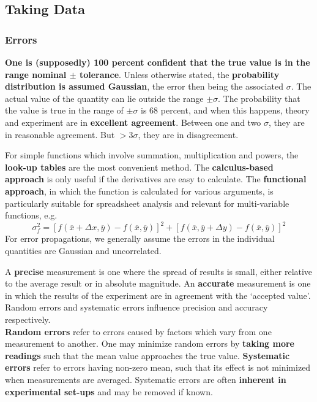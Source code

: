 \documentclass[a4paper]{article}
\begin{document}
\subsection{Taking Data}
\subsubsection*{Errors~\cite{squires_2001,hughes2010measurements}}
\begin{Note}
\textbf{One is (supposedly) 100 percent confident that the true value is in the range nominal $\pm$ tolerance}. Unless otherwise stated, the \textbf{probability distribution is assumed Gaussian}, the error then being the associated $\sigma$. The actual value of the quantity can lie outside the range $\pm\sigma$. The probability that the value is true in the range of $\pm\sigma$ is 68 percent, and when this happens, theory and experiment are in \textbf{excellent agreement}. Between one and two $\sigma$, they are in reasonable agreement. But $>3\sigma$, they are in disagreement.
\end{Note}
\begin{Note}
For simple functions which involve summation, multiplication and powers, the \textbf{look-up tables} are the most convenient method. The \textbf{calculus-based approach} is only useful if the derivatives are easy to calculate. The \textbf{functional approach}, in which the function is calculated for various arguments, is particularly suitable for spreadsheet analysis and relevant for multi-variable functions, e.g.
$$\sigma_f^2=[f(\overline{x}+\Delta x,\overline{y})-f(\overline{x},\overline{y})]^2+[f(\overline{x},\overline{y}+\Delta y)-f(\overline{x},\overline{y})]^2$$
For error propagations, we generally assume the errors in the individual quantities are Gaussian and uncorrelated.
\end{Note}
\begin{Note}
A \textbf{precise} measurement is one where the spread of results is small, either relative to the average result or in absolute magnitude. An \textbf{accurate} measurement is one in which the results of the experiment are in agreement with the `accepted value'. Random errors and systematic errors influence precision and accuracy respectively.\\[5pt]
\textbf{Random errors} refer to errors caused by factors which vary from one measurement to another. One may minimize random errors by \textbf{taking more readings} such that the mean value approaches the true value. \textbf{Systematic errors} refer to errors having non-zero mean, such that its effect is not minimized when measurements are averaged. Systematic errors are often \textbf{inherent in experimental set-ups} and may be removed if known.
\end{Note}
\end{document}
